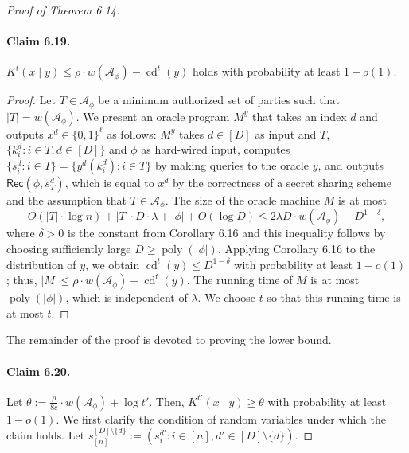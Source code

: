 \begin{proof}[Proof of Theorem 6.14]
\paragraph{Claim 6.19.}
$K^t(x\mid y)\leq\rho\cdot w(\mathcal A_\phi)-\operatorname{cd}^t(y)$ holds with probability at least $1-o(1)$.
\begin{proof}
Let $T\in\mathcal A_\phi$ be a minimum authorized set of parties such that $|T|=w(\mathcal A_\phi)$. We present an oracle program $M^y$ that takes an index $d$ and outputs $x^d\in\{0,1\}^\ell$ as follows: $M^y$ takes $d\in[D]$ as input and $T$, $\{k_i^d:i\in T,d\in[D]\}$ and $\phi$ as hard-wired input, computes $\{s_i^d:i\in T\}=\{y^d(k_i^d):i\in T\}$ by making queries to the oracle $y$, and outputs $\mathsf{Rec}(\phi,s_T^d)$, which is equal to $x^d$ by the correctness of a secret sharing scheme and the assumption that $T\in\mathcal A_\phi$. The size of the oracle machine $M$ is at most
\[O(|T|\cdot\log n)+|T|\cdot D\cdot\lambda+|\phi|+O(\log D)\leq2\lambda D\cdot w(\mathcal A_\phi)-D^{1-\delta},\]
where $\delta>0$ is the constant from Corollary 6.16 and this inequality follows by choosing sufficiently large $D\geq\operatorname{poly}(|\phi|)$. Applying Corollary 6.16 to the distribution of $y$, we obtain $\operatorname{cd}^t(y)\leq D^{1-\delta}$ with probability at least $1-o(1)$; thus, $|M|\leq\rho\cdot w(\mathcal A_\phi)-\operatorname{cd}^t(y)$. The running time of $M$ is at most $\operatorname{poly}(|\phi|)$, which is independent of $\lambda$. We choose $t$ so that this running time is at most $t$.
\end{proof}
The remainder of the proof is devoted to proving the lower bound.
\paragraph{Claim 6.20.}
Let $\theta:=\frac\rho{8c}\cdot w(\mathcal A_\phi)+\log t'$. Then, $K^{t'}(x\mid y)\geq\theta$ with probability at least $1-o(1)$.
We first clarify the condition of random variables under which the claim holds. Let $s_{[n]}^{[D]\setminus\{d\}}:=(s_i^{d'}:i\in[n],d'\in[D]\setminus\{d\})$.

\end{proof}
